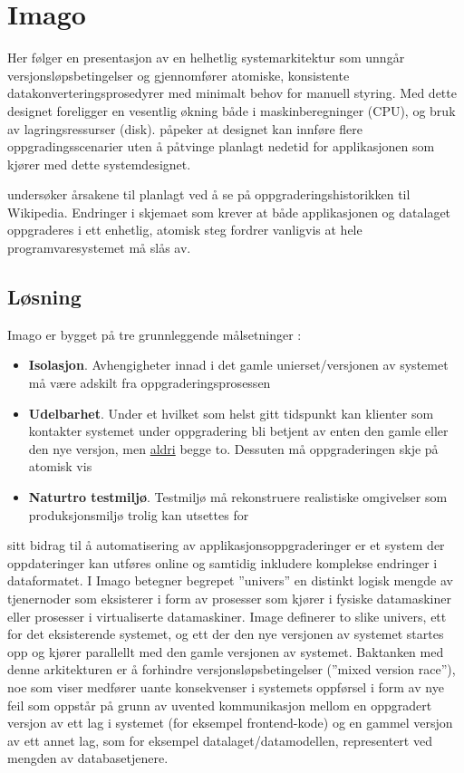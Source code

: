 \section{Imago}

Her følger en presentasjon av en helhetlig systemarkitektur som unngår versjonsløpsbetingelser og gjennomfører atomiske, konsistente datakonverteringsprosedyrer med minimalt behov for manuell styring. Med dette designet foreligger en vesentlig økning både i maskinberegninger (CPU), og bruk av lagringsressurser (disk). \cite{dumitras2009nodowntime} påpeker at designet kan innføre flere oppgradingsscenarier uten å påtvinge planlagt nedetid for applikasjonen som kjører med dette systemdesignet.

\cite{dumitras2009nodowntime} undersøker årsakene til planlagt ved å se på oppgraderingshistorikken til Wikipedia. Endringer i skjemaet som krever at både applikasjonen og datalaget oppgraderes i ett enhetlig, atomisk steg fordrer vanligvis at hele programvaresystemet må slås av.

\subsection{Løsning} \label{imagolist}
Imago er bygget på tre grunnleggende målsetninger \cite{dumitracs2009upgrades}:
\begin{itemize}
  \item \textbf{Isolasjon}. Avhengigheter innad i det gamle unierset/versjonen av systemet må være adskilt fra oppgraderingsprosessen
  \item \textbf{Udelbarhet}. Under et hvilket som helst gitt tidspunkt kan klienter som kontakter systemet under oppgradering bli betjent av enten den gamle eller den nye versjon, men \underline{aldri} begge to. Dessuten må oppgraderingen skje på atomisk vis
  \item \textbf{Naturtro testmiljø}. Testmiljø må rekonstruere realistiske omgivelser som produksjonsmiljø trolig kan utsettes for
\end{itemize}

\cite{dumitracs2009upgrades} sitt bidrag til å automatisering av applikasjonsoppgraderinger er et system der oppdateringer kan utføres online og samtidig inkludere komplekse endringer i dataformatet. I Imago betegner begrepet ''univers'' en distinkt logisk mengde av tjenernoder som eksisterer i form av prosesser som kjører i fysiske datamaskiner eller prosesser i virtualiserte datamaskiner. Image definerer to slike univers, ett for det eksisterende systemet, og ett der den nye versjonen av systemet startes opp og kjører parallellt med den gamle versjonen av systemet. Baktanken med denne arkitekturen er å forhindre versjonsløpsbetingelser (''mixed version race''), noe som \cite{dumitras2010upgrade} viser medfører uante konsekvenser i systemets oppførsel i form av nye feil som oppstår på grunn av uvented kommunikasjon mellom en oppgradert versjon av ett lag i systemet (for eksempel frontend-kode) og en gammel versjon av ett annet lag, som for eksempel datalaget/datamodellen, representert ved mengden av databasetjenere.

